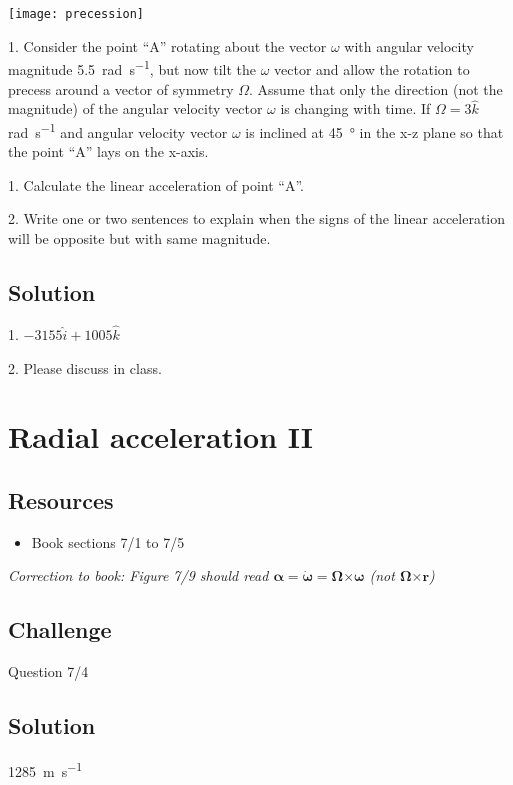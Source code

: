 \texttt{[image: precession]}

1. Consider the point ``A'' rotating about the vector $\omega$ with angular velocity magnitude \SI{5.5}{\radian\per\second}, but now tilt the $\omega$ vector and allow the rotation to precess around a vector of symmetry $\Omega$. Assume that only the direction (not the magnitude) of the angular velocity vector $\omega$ is changing with time. If $\Omega = 3\hat{k}$ \si{\radian\per\second} and angular velocity vector $\omega$ is inclined at \SI{45}{\degree} in the x-z plane so that the point ``A'' lays on the x-axis.

1. Calculate the linear acceleration of point ``A''.

2. Write one or two sentences to explain when the signs of the linear acceleration will be opposite but with same magnitude.


\subsection*{Solution}
1. $-3155 \hat{i} + 1005 \hat{k}$

2. Please discuss in class.




\newpage
\section{Radial acceleration II}

\subsection*{Resources}
\begin{itemize}
    \item Book sections 7/1 to 7/5
\end{itemize}

\emph{Correction to book: Figure 7/9 should read $\bm{\alpha} = \bm{\dot{\omega}} = \bm{\Omega} \bm{\times} \bm{\omega}$ (not $\bm{\Omega} \bm{\times} \bm{r}$)}

\subsection*{Challenge}
Question 7/4

\subsection*{Solution}
\SI{1285}{\meter\per\second}



